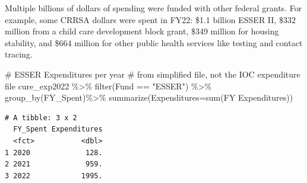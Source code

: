 \documentclass[
  letterpaper,
  DIV=11,
  numbers=noendperiod]{scrreport}
\newenvironment{Shaded}{\begin{snugshade}}{\end{snugshade}}
\newcommand{\AttributeTok}[1]{\textcolor[rgb]{0.40,0.45,0.13}{#1}}
\newcommand{\CommentTok}[1]{\textcolor[rgb]{0.37,0.37,0.37}{#1}}
\newcommand{\FunctionTok}[1]{\textcolor[rgb]{0.28,0.35,0.67}{#1}}
\newcommand{\NormalTok}[1]{\textcolor[rgb]{0.00,0.23,0.31}{#1}}
\newcommand{\SpecialCharTok}[1]{\textcolor[rgb]{0.37,0.37,0.37}{#1}}
\newcommand{\StringTok}[1]{\textcolor[rgb]{0.13,0.47,0.30}{#1}}
\begin{document}
Multiple billions of dollars of spending were funded with other federal
grants. For example, some CRRSA dollars were spent in FY22: \$1.1
billion ESSER II, \$332 million from a child care development block
grant, \$349 million for housing stability, and \$664 million for other
public health services like testing and contact tracing.

\begin{Shaded}
\begin{Highlighting}[]
\CommentTok{\# ESSER Expenditures per year}
\CommentTok{\# from simplified file, not the IOC expenditure file}
\NormalTok{cure\_exp2022 }\SpecialCharTok{\%\textgreater{}\%} 
  \FunctionTok{filter}\NormalTok{(Fund }\SpecialCharTok{==} \StringTok{"ESSER"}\NormalTok{) }\SpecialCharTok{\%\textgreater{}\%}
  \FunctionTok{group\_by}\NormalTok{(}\StringTok{\textasciigrave{}}\AttributeTok{FY\_Spent}\StringTok{\textasciigrave{}}\NormalTok{)}\SpecialCharTok{\%\textgreater{}\%} 
  \FunctionTok{summarize}\NormalTok{(}\AttributeTok{Expenditures=}\FunctionTok{sum}\NormalTok{(}\StringTok{\textasciigrave{}}\AttributeTok{FY Expenditures}\StringTok{\textasciigrave{}}\NormalTok{))}
\end{Highlighting}
\end{Shaded}

\begin{verbatim}
# A tibble: 3 x 2
  FY_Spent Expenditures
  <fct>           <dbl>
1 2020             128.
2 2021             959.
3 2022            1995.
\end{verbatim}
\end{document}
